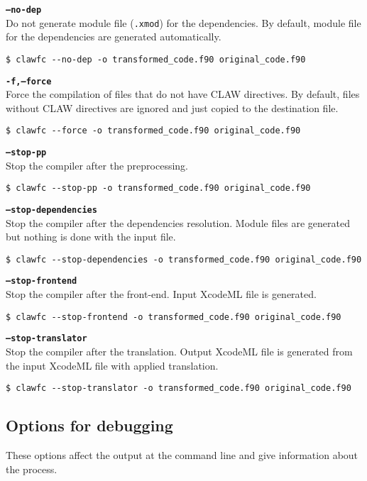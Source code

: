 \documentclass{article}
\begin{document}
\textbf{\texttt{--no-dep}}\\
Do not generate module file (\texttt{.xmod}) for the dependencies. By default, module file for the dependencies are generated automatically. 
\begin{lstlisting}
$ clawfc --no-dep -o transformed_code.f90 original_code.f90
\end{lstlisting}

\textbf{\texttt{-f,--force}}\\
Force the compilation of files that do not have CLAW directives. By default, files without CLAW directives are ignored and just copied to the destination file. 
\begin{lstlisting}
$ clawfc --force -o transformed_code.f90 original_code.f90
\end{lstlisting}

\textbf{\texttt{--stop-pp}}\\
Stop the compiler after the preprocessing.
\begin{lstlisting}
$ clawfc --stop-pp -o transformed_code.f90 original_code.f90
\end{lstlisting}

\textbf{\texttt{--stop-dependencies}}\\
Stop the compiler after the dependencies resolution. Module files are generated but nothing is done with the input file. 
\begin{lstlisting}
$ clawfc --stop-dependencies -o transformed_code.f90 original_code.f90
\end{lstlisting}

\textbf{\texttt{--stop-frontend}}\\
Stop the compiler after the front-end. Input XcodeML file is generated. 
\begin{lstlisting}
$ clawfc --stop-frontend -o transformed_code.f90 original_code.f90
\end{lstlisting}

\textbf{\texttt{--stop-translator}}\\
Stop the compiler after the translation. Output XcodeML file is generated from the input XcodeML file with applied translation. 
\begin{lstlisting}
$ clawfc --stop-translator -o transformed_code.f90 original_code.f90
\end{lstlisting}

\subsection{Options for debugging}
These options affect the output at the command line and give information about the process. 
\end{document}
